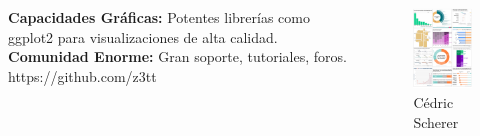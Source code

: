 \documentclass[11pt]{beamer}
\begin{document}

	\begin{frame}   
    		\begin{columns} %
			\begin{column}{0.5\textwidth}
            		\textbf{Capacidades Gráficas:} Potentes librerías como ggplot2 para visualizaciones de alta calidad.
            		\textbf{Comunidad Enorme:} Gran soporte, tutoriales, foros. 
           		https://github.com/z3tt
        		\end{column}
        		\begin{column}{0.5\textwidth}
            		\begin{figure}
                		\centering
                		\includegraphics[width= 0.9 \linewidth]{cedri2.png}
                		\caption{Cédric Scherer} %
                		\label{fig:cedric_scherer} %
            		\end{figure}
        		\end{column}
    		\end{columns} %
	\end{frame}
	
\end{document}
